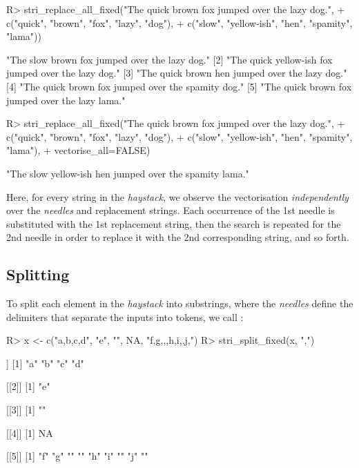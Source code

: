 \documentclass[nojss]{jss}\usepackage[]{graphicx}\usepackage[]{color}
\begin{document}
\begin{Schunk}
\begin{Sinput}
R> stri_replace_all_fixed("The quick brown fox jumped over the lazy dog.",
+    c("quick", "brown",      "fox", "lazy",    "dog"),
+    c("slow",  "yellow-ish", "hen", "spamity", "lama"))
\end{Sinput}
\begin{Soutput}
[1] "The slow brown fox jumped over the lazy dog."
[2] "The quick yellow-ish fox jumped over the lazy dog."
[3] "The quick brown hen jumped over the lazy dog."
[4] "The quick brown fox jumped over the spamity dog."
[5] "The quick brown fox jumped over the lazy lama."
\end{Soutput}
\begin{Sinput}
R> stri_replace_all_fixed("The quick brown fox jumped over the lazy dog.",
+    c("quick", "brown",      "fox", "lazy", "dog"),
+    c("slow",  "yellow-ish", "hen", "spamity", "lama"),
+    vectorise_all=FALSE)
\end{Sinput}
\begin{Soutput}
[1] "The slow yellow-ish hen jumped over the spamity lama."
\end{Soutput}
\end{Schunk}

\noindent
Here, for every string in the \textit{haystack}, we observe the vectorisation
\textit{independently} over the \textit{needles} and replacement strings.
Each occurrence of the 1st needle is substituted with the 1st replacement
string, then the search is repeated for the 2nd needle in order to replace
it with the 2nd corresponding string, and so forth.


\subsection{Splitting}

To  split each element in the \textit{haystack} into substrings,
where the \textit{needles} define the delimiters that separate
the inputs into tokens,
we call :

\begin{Schunk}
\begin{Sinput}
R> x <- c("a,b,c,d", "e", "", NA, "f,g,,,h,i,,j,")
R> stri_split_fixed(x, ",")
\end{Sinput}
\begin{Soutput}
[[1]]
[1] "a" "b" "c" "d"

[[2]]
[1] "e"

[[3]]
[1] ""

[[4]]
[1] NA

[[5]]
[1] "f" "g" ""  ""  "h" "i" ""  "j" ""
\end{Soutput}
\end{Schunk}
\end{document}
